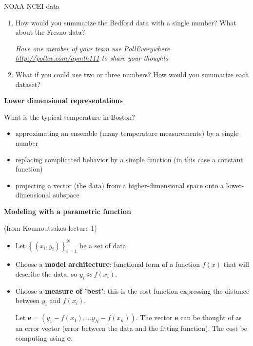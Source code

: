 \documentclass[12pt,letterpaper,noanswers]{exam}
\newcommand{\vc}[1]{\boldsymbol{#1}}
\begin{document}
NOAA NCEI data

\begin{enumerate}[series=classQ]
\item How would you summarize the Bedford data with a single number?  What about the Fresno data?

\emph{Have one member of your team use PollEverywhere \url{http://pollev.com/apmth111} to share your thoughts}

\item What if you could use two or three numbers?  How would you summarize each dataset?
\end{enumerate}
\vspace{1cm}

\noindent\textbf{Lower dimensional representations}
\begin{tcolorbox}
What is the typical temperature in Boston?
\begin{itemize}
\itemsep0pt
    \item approximating an ensemble (many temperature measurements) by a single number
    \item replacing complicated behavior by a simple function (in this case a constant function)
    \item projecting a vector (the data) from a higher-dimensional space onto a lower-dimensional subspace
\end{itemize}
\end{tcolorbox}



\noindent\textbf{Modeling with a parametric function}
\begin{tcolorbox}
\noindent (from Koumoutsakos lecture 1)

\begin{itemize}
\itemsep0pt
    \item Let $\left\{(x_i,y_i)\right\}_{i=1}^N$ be a set of data.
    \item Choose a \textbf{model architecture}: functional form of a function $f(x)$ that will describe the data, so $y_i\approx f(x_i)$.
    \item Choose a \textbf{measure of 'best'}: this is the cost function expressing the distance between $y_i$ and $f(x_i)$.
    
    Let $\vc{e} = (y_1-f(x_1),...y_N-f(x_n))$.  The vector $\vc{e}$ can be thought of as an error vector (error between the data and the fitting function).  The cost be computing using $\vc{e}$.
\end{itemize}

\end{tcolorbox}
\end{document}
